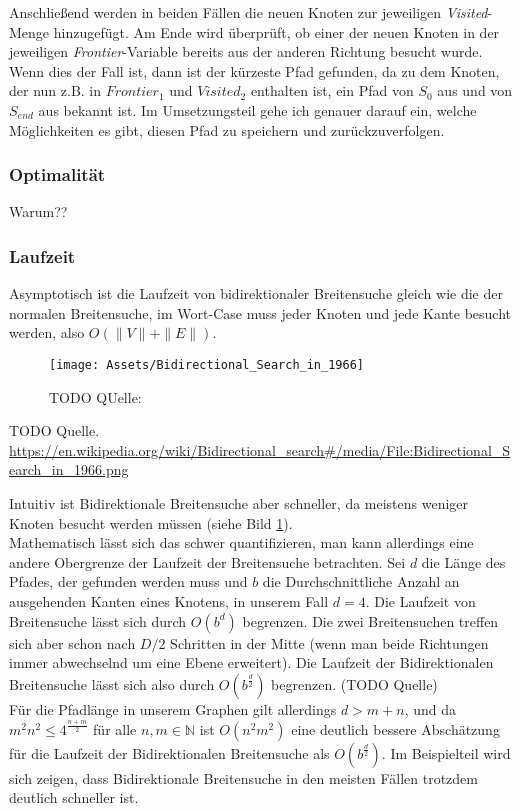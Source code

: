 \documentclass[a4paper,10pt,ngerman]{scrartcl}
\begin{document}
    Anschließend werden in beiden Fällen die neuen Knoten zur jeweiligen \textit{Visited}-Menge hinzugefügt.
    Am Ende wird überprüft, ob einer der neuen Knoten in der jeweiligen \textit{Frontier}-Variable bereits aus der anderen Richtung besucht wurde. Wenn dies der Fall ist, dann ist der kürzeste Pfad gefunden, da zu dem Knoten, der nun z.B. in $\textit{Frontier}_1$ und $\textit{Visited}_2$ enthalten ist, ein Pfad von $S_0$ aus und von $S_{end}$ aus bekannt ist. Im Umsetzungsteil gehe ich genauer darauf ein, welche Möglichkeiten es gibt, diesen Pfad zu speichern und zurückzuverfolgen.

    \subsubsection{Optimalität}
    Warum??

    \subsubsection{Laufzeit}
    Asymptotisch ist die Laufzeit von bidirektionaler Breitensuche gleich wie die der normalen Breitensuche, im Wort-Case muss jeder Knoten und jede Kante besucht werden, also $O(\|V\| + \|E\|)$.
    \begin{figure}
        \label{fig:1}
        \centering
        \texttt{[image: Assets/Bidirectional\_Search\_in\_1966]}
        \caption {TODO QUelle: }
    \end{figure}
    TODO Quelle. \url{https://en.wikipedia.org/wiki/Bidirectional_search#/media/File:Bidirectional_Search_in_1966.png}

    Intuitiv ist Bidirektionale Breitensuche aber schneller, da meistens weniger Knoten besucht werden müssen (siehe Bild \ref{fig:1}). \\
    Mathematisch lässt sich das schwer quantifizieren, man kann allerdings eine andere Obergrenze der Laufzeit der Breitensuche betrachten. Sei $d$ die Länge des Pfades, der gefunden werden muss und $b$ die Durchschnittliche Anzahl an ausgehenden Kanten eines Knotens, in unserem Fall $d = 4$. Die Laufzeit von Breitensuche lässt sich durch $O(b^d)$ begrenzen. Die zwei Breitensuchen treffen sich aber schon nach $D/2$ Schritten in der Mitte (wenn man beide Richtungen immer abwechselnd um eine Ebene erweitert). Die Laufzeit der Bidirektionalen Breitensuche lässt sich also durch $O(b^{\frac d 2})$ begrenzen. (TODO Quelle) \\
    Für die Pfadlänge in unserem Graphen gilt allerdings $d > m + n$, und da $m^2 n^2  \le 4^{\frac {n + m} 2}$ für alle $n, m \in \mathbb N$ ist $O(n^2 m^2)$ eine deutlich bessere Abschätzung für die Laufzeit der Bidirektionalen Breitensuche als $O(b^{\frac d 2})$.
    Im Beispielteil wird sich zeigen, dass Bidirektionale Breitensuche in den meisten Fällen trotzdem deutlich schneller ist.
\end{document}
